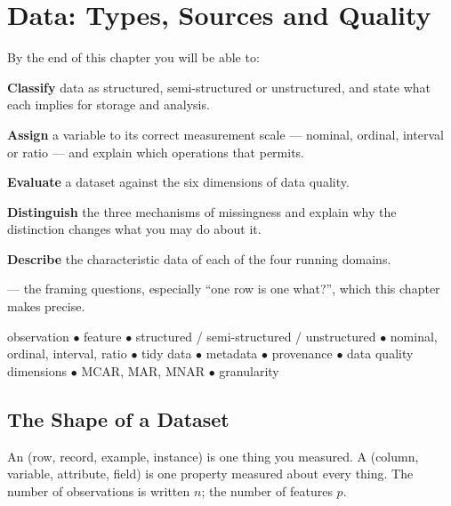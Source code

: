 \chapter{Data: Types, Sources and Quality}\label{ch:data}

\begin{outcomes}
By the end of this chapter you will be able to:
\begin{tight}
  \item \textbf{Classify} data as structured, semi-structured or unstructured, and state what each implies for storage and analysis.
  \item \textbf{Assign} a variable to its correct measurement scale --- nominal, ordinal, interval or ratio --- and explain which operations that permits.
  \item \textbf{Evaluate} a dataset against the six dimensions of data quality.
  \item \textbf{Distinguish} the three mechanisms of missingness and explain why the distinction changes what you may do about it.
  \item \textbf{Describe} the characteristic data of each of the four running domains.
\end{tight}
\end{outcomes}

\begin{prereq}
 --- the framing questions, especially ``one row is one what?'',
which this chapter makes precise.
\end{prereq}

\begin{keyterms}
observation $\bullet$ feature $\bullet$ structured / semi-structured / unstructured
$\bullet$ nominal, ordinal, interval, ratio $\bullet$ tidy data $\bullet$ metadata
$\bullet$ provenance $\bullet$ data quality dimensions $\bullet$ MCAR, MAR, MNAR
$\bullet$ granularity
\end{keyterms}

\section{The Shape of a Dataset}

\begin{definitionbox}
An  (row, record, example, instance) is one thing you measured.
A  (column, variable, attribute, field) is one property measured
about every thing. The number of observations is written $n$; the number of
features $p$.
\end{definitionbox}

